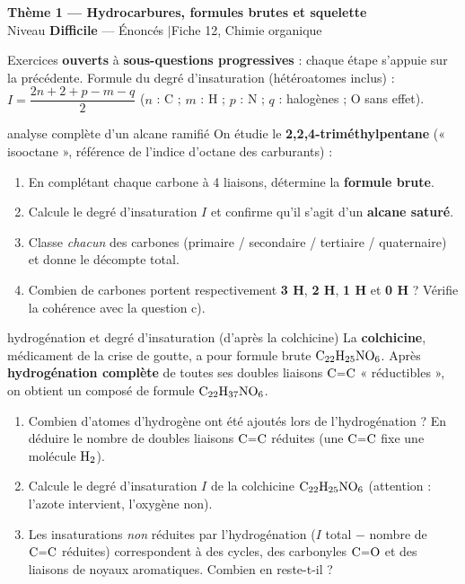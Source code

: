 \documentclass[11pt,a4paper]{article}
\newcommand{\banner}[2]{%
\begin{tcolorbox}[enhanced,colback=primary,colframe=primary,arc=5pt,boxrule=0pt,
   left=5mm,right=5mm,top=2.5mm,bottom=2.5mm,coltext=white]
{\large\bfseries #1}\\[1pt]{\small #2}
\end{tcolorbox}\vspace{2pt}}
\begin{document}
\banner{Thème 1 — Hydrocarbures, formules brutes et squelette}{Niveau \textbf{Difficile} — Énoncés \quad$\vert$\quad Fiche 12, Chimie organique}

\begin{consigne}
Exercices \textbf{ouverts} à \textbf{sous-questions progressives} : chaque étape s'appuie sur la précédente. Formule du degré d'insaturation (hétéroatomes inclus) : $I=\dfrac{2n+2+p-m-q}{2}$ ($n$ : C ; $m$ : H ; $p$ : N ; $q$ : halogènes ; O sans effet).
\end{consigne}

\begin{exo}{analyse complète d'un alcane ramifié}
On étudie le \textbf{2,2,4-triméthylpentane} (« isooctane », référence de l'indice d'octane des carburants) :
\begin{center}\end{center}
\begin{enumerate}[label=\textbf{\alph*)},leftmargin=2em,itemsep=1pt]
  \item En complétant chaque carbone à 4 liaisons, détermine la \textbf{formule brute}.
  \item Calcule le degré d'insaturation $I$ et confirme qu'il s'agit d'un \textbf{alcane saturé}.
  \item Classe \emph{chacun} des carbones (primaire / secondaire / tertiaire / quaternaire) et donne le décompte total.
  \item Combien de carbones portent respectivement \textbf{3 H}, \textbf{2 H}, \textbf{1 H} et \textbf{0 H} ? Vérifie la cohérence avec la question c).
\end{enumerate}
\end{exo}

\begin{exo}{hydrogénation et degré d'insaturation (d'après la colchicine)}
La \textbf{colchicine}, médicament de la crise de goutte, a pour formule brute $\ce{C22H25NO6}$. Après \textbf{hydrogénation complète} de toutes ses doubles liaisons $\ce{C=C}$ « réductibles », on obtient un composé de formule $\ce{C22H37NO6}$.
\begin{enumerate}[label=\textbf{\alph*)},leftmargin=2em,itemsep=1pt]
  \item Combien d'atomes d'hydrogène ont été ajoutés lors de l'hydrogénation ? En déduire le nombre de doubles liaisons $\ce{C=C}$ réduites (une $\ce{C=C}$ fixe une molécule $\ce{H2}$).
  \item Calcule le degré d'insaturation $I$ de la colchicine $\ce{C22H25NO6}$ (attention : l'azote intervient, l'oxygène non).
  \item Les insaturations \emph{non} réduites par l'hydrogénation ($I$ total $-$ nombre de $\ce{C=C}$ réduites) correspondent à des cycles, des carbonyles $\ce{C=O}$ et des liaisons de noyaux aromatiques. Combien en reste-t-il ?
\end{enumerate}
\end{exo}
\end{document}
